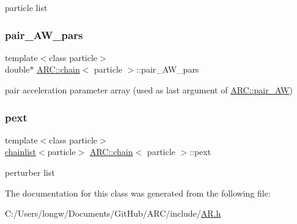 particle list 

\hypertarget{classARC_1_1chain_a8c5f29c3d307bb216fdc68641b412c72}{}\label{classARC_1_1chain_a8c5f29c3d307bb216fdc68641b412c72} 
\subsubsection{\texorpdfstring{pair\+\_\+\+A\+W\+\_\+pars}{pair\_AW\_pars}}
{\footnotesize\ttfamily template$<$class particle$>$ \\
double$\ast$ \hyperlink{classARC_1_1chain}{A\+R\+C\+::chain}$<$ particle $>$\+::pair\+\_\+\+A\+W\+\_\+pars}



pair acceleration parameter array (used as last argument of \hyperlink{namespaceARC_a5c4308ca4a8d0e0ff59fdce30f00274c}{A\+R\+C\+::pair\+\_\+\+AW}) 

\hypertarget{classARC_1_1chain_a6e4f41c7d3f8d44a4a01734ff4ab20cf}{}\label{classARC_1_1chain_a6e4f41c7d3f8d44a4a01734ff4ab20cf} 
\subsubsection{\texorpdfstring{pext}{pext}}
{\footnotesize\ttfamily template$<$class particle$>$ \\
\hyperlink{classARC_1_1chainlist}{chainlist}$<$particle$>$ \hyperlink{classARC_1_1chain}{A\+R\+C\+::chain}$<$ particle $>$\+::pext}



perturber list 



The documentation for this class was generated from the following file\+:\begin{DoxyCompactItemize}
\item 
C\+:/\+Users/longw/\+Documents/\+Git\+Hub/\+A\+R\+C/include/\hyperlink{AR_8h}{A\+R.\+h}\end{DoxyCompactItemize}
